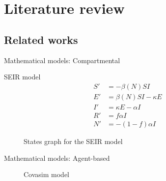 \section{Literature review}

\subsection{Related works}

\begin{frame}{Mathematical models: Compartmental}
    \begin{block}{\gls{SEIR} model \cite{brauerCompartmentalModelsEpidemiology2008}}
        \begin{equation*}
            \begin{aligned}
                S' &= - \beta(N)SI \\
                E' &= \beta(N)SI - \kappa E \\
                I' &= \kappa E - \alpha I \\
                R' &= f \alpha I \\
                N' &= - (1 - f) \alpha I
            \end{aligned}
        \end{equation*}
    \end{block}

    \begin{figure}
        \centering
        \caption{States graph for the SEIR model}
        \label{fig:seir-model-transition-graph}
    \end{figure}
\end{frame}

\begin{frame}{Mathematical models: Agent-based}
    \begin{figure}[!htb]
        \centering
        \caption{Covasim model \cite{kerrCovasimAgentbasedModel2021}}
        \label{fig:covasim-schematics}
    \end{figure}
\end{frame}

